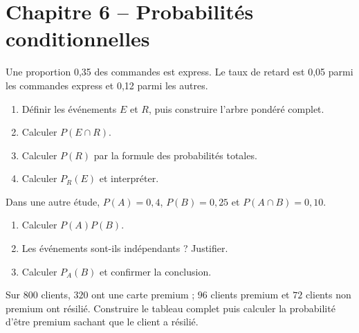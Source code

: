 \section*{Chapitre 6 -- Probabilités conditionnelles}
\begin{exercice}
Une proportion 0{,}35 des commandes est express. Le taux de retard est 0{,}05 parmi les commandes express et 0{,}12 parmi les autres.
\begin{enumerate}
\item Définir les événements $E$ et $R$, puis construire l'arbre pondéré complet.
\item Calculer $P(E\cap R)$.
\item Calculer $P(R)$ par la formule des probabilités totales.
\item Calculer $P_R(E)$ et interpréter.
\end{enumerate}
\end{exercice}
\begin{exercice}[2 -- Indépendance]
Dans une autre étude, $P(A)=0{,}4$, $P(B)=0{,}25$ et $P(A\cap B)=0{,}10$.
\begin{enumerate}
\item Calculer $P(A)P(B)$.
\item Les événements sont-ils indépendants ? Justifier.
\item Calculer $P_A(B)$ et confirmer la conclusion.
\end{enumerate}
\end{exercice}
\begin{exercice}
Sur $800$ clients, $320$ ont une carte premium ; $96$ clients premium et $72$ clients non premium ont résilié. Construire le tableau complet puis calculer la probabilité d'être premium sachant que le client a résilié.
\end{exercice}

